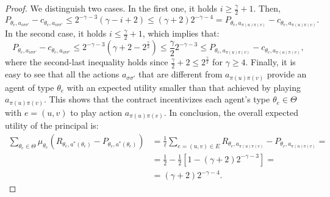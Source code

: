 \begin{proof}
	We distinguish two cases.
	In the first one, it holds $i\ge \frac{\gamma}{2}+1$.
	Then,
	\[
		P_{\theta_{e}, a_{i \sigma \sigma'}} - c_{\theta_e, a_{i \sigma\sigma'}}  \le 2^{-\gamma-3}  (\gamma-i+2) \le (\gamma+2) 2^{-\gamma-4} = P_{\theta_{e}, a_{\pi(u) \pi(v)}} - c_{\theta_e, a_{\pi(u) \pi(v)}}.
	\]
	In the second case, it holds $i\le \frac{\gamma}{2}+1$, which implies that:
	\[
		P_{\theta_{e}, a_{i \sigma \sigma'}} - c_{\theta_e, a_{i \sigma\sigma'}}  \leq 2^{-\gamma-3} (\gamma+2-2^{\frac{\gamma}{2}})\le \frac{\gamma}{2}2^{-\gamma-3} \leq P_{\theta_{e}, a_{\pi(u) \pi(v)}} - c_{\theta_e, a_{\pi(u) \pi(v)}},
	\]
	where the second-last inequality holds since $\frac{\gamma}{2} + 2 \leq 2^{\frac{\gamma}{2}}$ for $\gamma \geq 4$.
	Finally, it is easy to see that all the actions $a_{\sigma \sigma'}$ that are different from $a_{\pi(u) \pi(v)}$ provide an agent of type $\theta_{e}$ with an expected utility smaller than that achieved by playing $a_{\pi(u) \pi(v)}$.
	This shows that the contract incentivizes each agent's type $\theta_{e} \in \Theta$ with $e = (u,v)$ to play action $a_{\pi(u) \pi(v)}$.
	In conclusion, the overall expected utility of the principal is:
	\begin{align*}
		\sum_{\theta_{e} \in \Theta} \mu_{\theta_{e}} \left( R_{\theta_{e}, a^*(\theta_{e})} - P_{\theta_{e}, a^*(\theta_{e})} \right) &= \frac{1}{\ell} \sum_{e = (u,v) \in E} R_{\theta_{e}, a_{\pi(u) \pi(v)} } - P_{\theta_{e}, a_{\pi(u) \pi(v)} } = \\
		& = \frac{1}{2} - \frac{1}{2} \left[  1-(\gamma+2) 2^{-\gamma-3} \right] =\\
		& = (\gamma+2) 2^{-\gamma-4}.
	\end{align*}
	

\end{proof}
